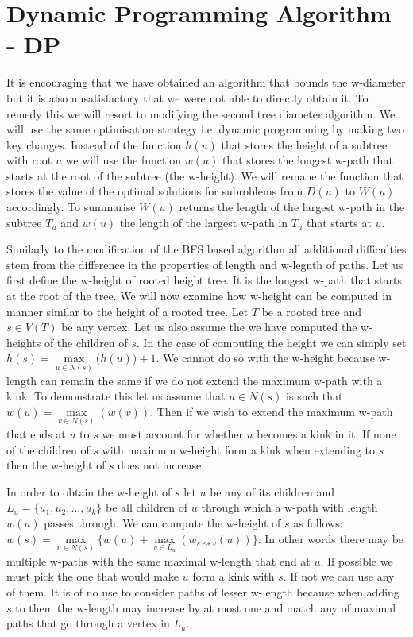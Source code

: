 \section{Dynamic Programming Algorithm - DP}

It is encouraging that we have obtained an algorithm that bounds the w-diameter but it is also unsatisfactory that we were not able to directly obtain it. To remedy this we will resort to modifying the second tree diameter algorithm. We will use the same optimisation strategy i.e. dynamic programming by making two key changes. Instead of the function $h(u)$ that stores the height of a subtree with root $u$ we will use the function $w(u)$ that stores the longest w-path that starts at the root of the subtree (the w-height). We will remane the function that stores the value of the optimal solutions for subroblems from $D(u)$ to $W(u)$ accordingly. To summarise $W(u)$ returns the length of the largest w-path in the subtree $T_u$ and $w(u)$ the length of the largest w-path in $T_u$ that starts at $u$.

Similarly to the modification of the BFS based algorithm all additional difficulties stem from the difference in the properties of length and w-legnth of paths. Let us first define the w-height of rooted height tree. It is the longest w-path that starts at the root of the tree. We will now examine how w-height can be computed in manner similar to the height of a rooted tree. Let $T$ be a rooted tree and $s \in V(T)$ be any vertex. Let us also assume the we have computed the w-heights of the children of $s$. In the case of computing the height we can simply set $h(s) = \max\limits_{u \in N(s)}\big( h(u) \big) + 1$. We cannot do so with the w-height because w-length can remain the same if we do not extend the maximum w-path with a kink.  To demonstrate this let us assume that $u \in N(s)$ is such that $w(u) = \max\limits_{v \in N(s)}(w(v))$. Then if we wish to extend the maximum w-path that ends at $u$ to $s$ we must account for whether $u$ becomes a kink in it. If none of the children of $s$ with maximum w-height form a kink when extending to $s$ then the w-height of $s$ does not increase.

In order to obtain the w-height of $s$ let $u$ be any of its children and $L_u = \{u_1, u_2, ..., u_k\}$ be all children of $u$ through which a w-path with length $w(u)$ passes through. We can compute the w-height of $s$ as follows: $w(s) = \max\limits_{u \in N(s)}\{ w(u) + \max\limits_{v \in L_u}(w_{s \rightsquigarrow v}(u)) \}$. In other words there may be multiple w-paths with the same maximal w-length that end at $u$. If possible we must pick the one that would make $u$ form a kink with $s$. If not we can use any of them. It is of no use to consider paths of lesser w-length because when adding $s$ to them the w-length may increase by at most one and match any of maximal paths that go through a vertex in $L_u$.

